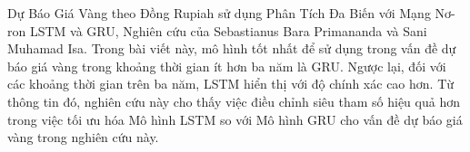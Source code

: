 Dự Báo Giá Vàng theo Đồng Rupiah sử dụng Phân Tích Đa Biến với Mạng Nơ-ron LSTM và GRU\cite{article4}, Nghiên cứu của Sebastianus Bara Primananda và Sani Muhamad Isa. Trong bài viết này, mô hình tốt nhất để sử dụng trong vấn đề dự báo giá vàng trong khoảng thời gian ít hơn ba năm là GRU. Ngược lại, đối với các khoảng thời gian trên ba năm, LSTM hiển thị với độ chính xác cao hơn. Từ thông tin đó, nghiên cứu này cho thấy việc điều chỉnh siêu tham số hiệu quả hơn trong việc tối ưu hóa Mô hình LSTM so với Mô hình GRU cho vấn đề dự báo giá vàng trong nghiên cứu này.